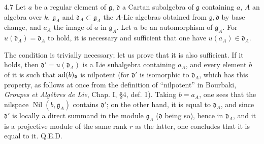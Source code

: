 \begin{corollary}{4.7}\label{XIII.4.7}
Let $a$ be a regular element of $\mathfrak g$, $\mathfrak d$ a Cartan
subalgebra of $\mathfrak g$ containing $a$, $A$ an algebra over $k$,
$\mathfrak g_A$ and $\mathfrak d_A\subset\mathfrak g_A$ the $A$-Lie
algebras obtained from $\mathfrak g,\mathfrak d$ by base change,
and $a_A$ the image of $a$ in $\mathfrak g_A$. Let $u$ be an automorphism
of $\mathfrak g_A$. For $u(\mathfrak d_A)=\mathfrak d_A$ to hold,
it is necessary and sufficient that one have $u(a_A)\in\mathfrak d_A$.
\end{corollary}
The condition is trivially necessary; let us prove that it is also
sufficient. If it holds, then $\mathfrak d'=u(\mathfrak d_A)$ is a
Lie subalgebra containing $a_A$, and every element $b$ of it is such
that $\operatorname{ad}(b)_{\mathfrak d}$ is nilpotent (for $\mathfrak d'$ is
isomorphic to $\mathfrak d_A$, which has this property, as follows
at once from the definition of ``nilpotent'' in Bourbaki, \emph{Groupes
et Alg\`ebres de Lie}, Chap. I, \S 4, def. 1). Taking $b=a_A$, one
sees that the nilspace $\operatorname{Nil}(b,\mathfrak g_A)$ contains
$\mathfrak d'$; on the other hand, it is equal to $\mathfrak d_A$,
and since $\mathfrak d'$ is locally a direct summand in the module
$\mathfrak g_A$ ($\mathfrak d$ being so), hence in $\mathfrak d_A$,
and it is a projective module of the same rank $r$ as the latter,
one concludes that it is equal to it. \hfill Q.E.D.

